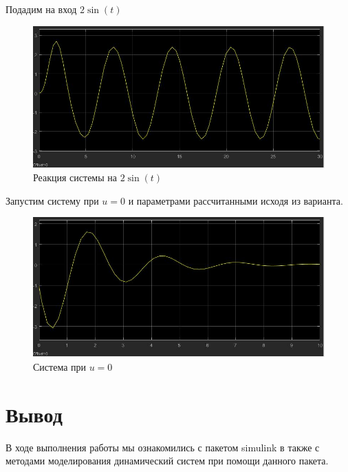 \documentclass[a4paper, 12pt]{article}
\begin{document}
        \newpage
        Подадим на вход $2\sin(t)$
        \begin{figure}[H]
            \centering
            \includegraphics[scale=0.4]{2.2.jpg}
            \captionsetup{skip=0pt}
            \caption{Реакция системы на $2\sin(t)$}
            \label{fig:5imspdf}
        \end{figure}
        Запустим систему при $u = 0$ и параметрами рассчитанными исходя из варианта.
        \begin{figure}[H]
            \centering
            \includegraphics[scale=0.4]{2.3.jpg}
            \captionsetup{skip=0pt}
            \caption{Система при $u = 0$}
            \label{fig:5imspdf}
        \end{figure}
        \section{Вывод}
            В ходе выполнения работы мы ознакомились с пакетом simulink в также с методами моделирования динамический систем при помощи данного пакета.
\end{document}
